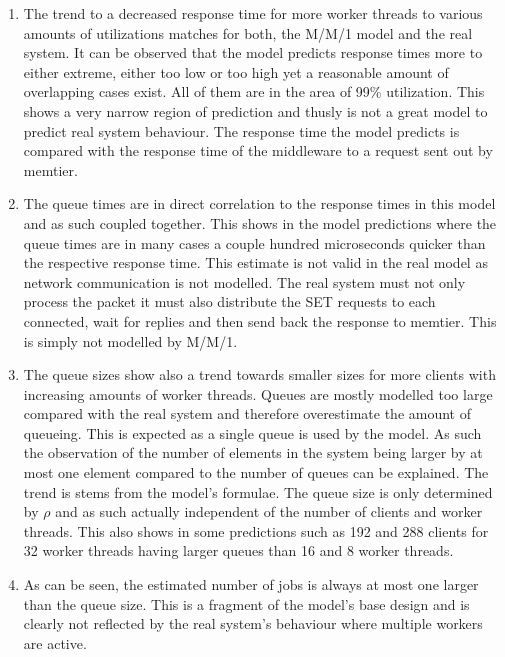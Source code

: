         \begin{enumerate}
            \item The trend to a decreased response time for more worker threads to various amounts of utilizations
                  matches for both, the M/M/1 model and the real system. It can be observed that the model predicts
                  response times more to either extreme, either too low or too high yet a reasonable amount of
                  overlapping cases exist. All of them are in the area of 99\% utilization. This shows a very narrow
                  region of prediction and thusly is not a great model to predict real system behaviour. The response
                  time the model predicts is compared with the response time of the middleware to a request sent out by
                  memtier.
            \item The queue times are in direct correlation to the response times in this model and as such coupled
                  together. This shows in the model predictions where the queue times are in many cases a couple hundred
                  microseconds quicker than the respective response time. This estimate is not valid in the real model
                  as network communication is not modelled. The real system must not only process the packet it must
                  also distribute the SET requests to each \srv{} connected, wait for replies and then send back the
                  response to memtier. This is simply not modelled by M/M/1.
            \item The queue sizes show also a trend towards smaller sizes for more clients with increasing amounts of
                  worker threads. Queues are mostly modelled too large compared with the real system and therefore
                  overestimate the amount of queueing. This is expected as a single queue is used by the model. As such
                  the observation of the number of elements in the system being larger by at most one element compared
                  to the number of queues can be explained.\newline
                  The trend is stems from the model's formulae. The queue size is only determined by $\rho$ and as such
                  actually independent of the number of clients and worker threads. This also shows in some predictions
                  such as 192 and 288 clients for 32 worker threads having larger queues than 16 and 8 worker threads.
            \item As can be seen, the estimated number of jobs is always at most one larger than the queue size. This is
                  a fragment of the model's base design and is clearly not reflected by the real system's behaviour
                  where multiple workers are active.
        \end{enumerate}

